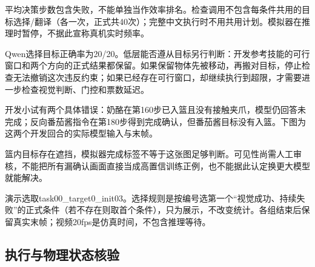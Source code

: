 平均决策步数包含失败，不能单独当作效率排名。检查调用不包含每条件共用的目标选择/翻译（各一次，正式共40次）；完整中文执行时不用共用计划。模拟器在推理时暂停，不据此宣称真机实时频率。

Qwen选择目标正确率为20/20。低层能否遵从目标另行判断：开发参考技能的可行窗口和两个方向的正式结果都保留。如果保留物体先被移动，再搬对目标，停止检查无法撤销这次违反约束；如果已经存在可行窗口，却继续执行到超限，才需要进一步检查视觉判断、门控和票数延迟。

开发小试有两个具体错误：奶酪在第160步已入篮且没有接触夹爪，模型仍回答未完成；反向番茄酱指令在第180步得到完成确认，但番茄酱目标没有入篮。下图为这两个开发回合的实际模型输入与末帧。

篮内目标存在遮挡，模拟器完成标签不等于这张图足够判断。可见性尚需人工审核，不能把所有漏确认画面直接当成高置信训练正例，也不能据此认定换更大模型就能解决。


演示选取task00\_target0\_init03。选择规则是按编号选第一个``视觉成功、持续失败''的正式条件（若不存在则取首个条件），只为展示，不改变统计。各组结束后保留真实末帧；视频20fps是仿真时间，不包含推理等待。


\subsection{执行与物理状态核验}\label{s13-detail-5}

